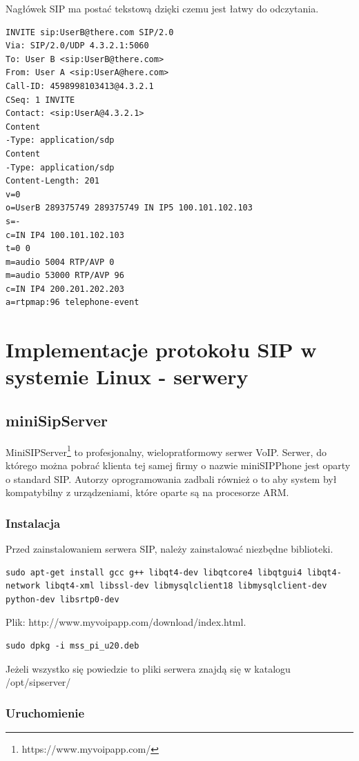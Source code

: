 Nagłówek SIP ma postać tekstową dzięki czemu jest łatwy do odczytania.

\begin{lstlisting}
INVITE sip:UserB@there.com SIP/2.0
Via: SIP/2.0/UDP 4.3.2.1:5060
To: User B <sip:UserB@there.com>
From: User A <sip:UserA@here.com>
Call-ID: 4598998103413@4.3.2.1
CSeq: 1 INVITE
Contact: <sip:UserA@4.3.2.1>
Content
-Type: application/sdp
Content
-Type: application/sdp
Content-Length: 201
v=0
o=UserB 289375749 289375749 IN IP5 100.101.102.103
s=-
c=IN IP4 100.101.102.103
t=0 0
m=audio 5004 RTP/AVP 0
m=audio 53000 RTP/AVP 96
c=IN IP4 200.201.202.203
a=rtpmap:96 telephone-event
\end{lstlisting}

\section{Implementacje protokołu SIP w systemie Linux    - serwery} 

\subsection{miniSipServer}
MiniSIPServer\footnote{https://www.myvoipapp.com/} to profesjonalny, wielopratformowy serwer VoIP. Serwer, do którego można pobrać klienta tej samej firmy o nazwie miniSIPPhone jest oparty o standard SIP. Autorzy oprogramowania zadbali również o to aby system był kompatybilny z urządzeniami, które oparte są na procesorze ARM. 


\subsubsection{Instalacja}
Przed zainstalowaniem serwera SIP, należy zainstalować niezbędne biblioteki. 

\begin{lstlisting}
sudo apt-get install gcc g++ libqt4-dev libqtcore4 libqtgui4 libqt4-network libqt4-xml libssl-dev libmysqlclient18 libmysqlclient-dev python-dev libsrtp0-dev
\end{lstlisting}
Plik: http://www.myvoipapp.com/download/index.html. 

\begin{lstlisting}
sudo dpkg -i mss_pi_u20.deb
\end{lstlisting}
Jeżeli wszystko się powiedzie to pliki serwera znajdą się w katalogu /opt/sipserver/

\subsubsection{Uruchomienie}

